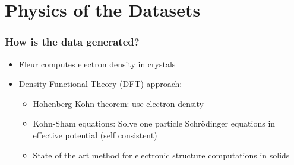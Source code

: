 
\section{Physics of the Datasets}


\begin{frame}\frametitle{How is the data generated?}
    \begin{itemize}

    \item Fleur computes electron density in crystals
    \item Density Functional Theory (DFT) approach:
        \begin{itemize}
        \item Hohenberg-Kohn theorem: use electron density 
        \item Kohn-Sham equations: Solve one particle Schr\"odinger equations in effective potential (self consistent)
        \item State of the art method for electronic structure computations in solids
        \end{itemize}
    \end{itemize}
\end{frame}

